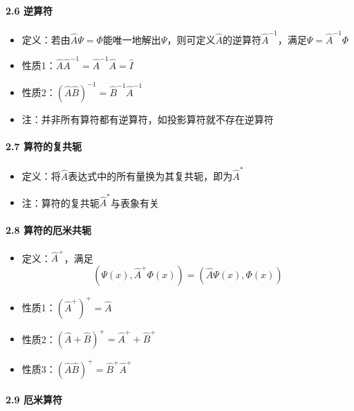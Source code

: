 \documentclass[UTF8,twocolumn]{ctexart}
\providecommand{\tightlist}{%
  \setlength{\itemsep}{0pt}\setlength{\parskip}{0pt}}
\let\oldparagraph\paragraph
\renewcommand{\paragraph}[1]{\oldparagraph{#1}\mbox{}}
\begin{document}
\hypertarget{ux9006ux7b97ux7b26}{%
\paragraph{ 2.6 逆算符}\label{ux9006ux7b97ux7b26}}

\begin{itemize}
\tightlist
\item
  定义：若由\(\hat{A}\Psi=\Phi\)能唯一地解出\(\Psi\)，则可定义\(\hat{A}\)的逆算符\(\hat{A}^{-1}\)，满足\(\Psi=\hat{A}^{-1}\Phi\)
\item
  性质1：\(\hat{A}\hat{A}^{-1}=\hat{A}^{-1}\hat{A}=\hat{I}\)
\item
  性质2：\((\hat{A}\hat{B})^{-1}=\hat{B}^{-1}\hat{A}^{-1}\)
\item
  注：并非所有算符都有逆算符，如投影算符就不存在逆算符
\end{itemize}

\hypertarget{ux7b97ux7b26ux7684ux590dux5171ux8f6d}{%
\paragraph{ 2.7
算符的复共轭}\label{ux7b97ux7b26ux7684ux590dux5171ux8f6d}}

\begin{itemize}
\tightlist
\item
  定义：将\(\hat{A}\)表达式中的所有量换为其复共轭，即为\(\hat{A}^*\)
\item
  注：算符的复共轭\(\hat{A}^*\)与表象有关
\end{itemize}

\hypertarget{ux7b97ux7b26ux7684ux5384ux7c73ux5171ux8f6d}{%
\paragraph{ 2.8
算符的厄米共轭}\label{ux7b97ux7b26ux7684ux5384ux7c73ux5171ux8f6d}}

\begin{itemize}
\tightlist
\item
  定义：\(\hat{A}^+\)，满足
  $$(\Psi(x),\hat{A}^+\Phi(x))=(\hat{A}\Psi(x),\Phi(x))$$
\item
  性质1：\((\hat{A}^+)^+=\hat{A}\)
\item
  性质2：\((\hat{A}+\hat{B})^+=\hat{A}^++\hat{B}^+\)
\item
  性质3：\((\hat{A}\hat{B})^+=\hat{B}^+\hat{A}^+\)
\end{itemize}

\hypertarget{ux5384ux7c73ux7b97ux7b26}{%
\paragraph{ 2.9 厄米算符}\label{ux5384ux7c73ux7b97ux7b26}}
\end{document}
